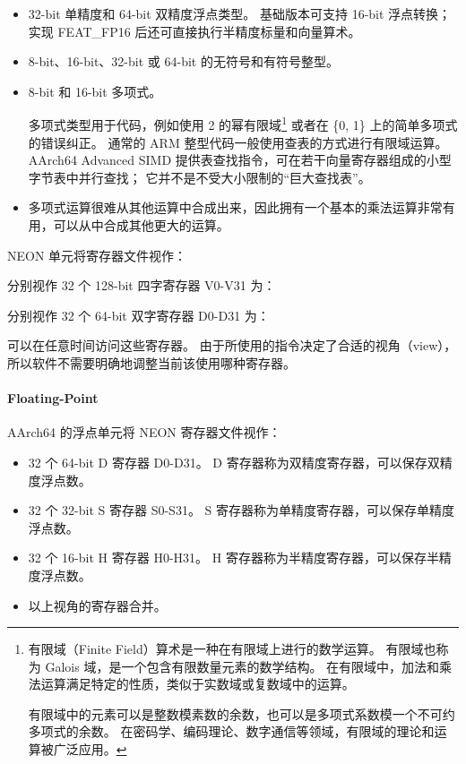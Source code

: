 \begin{itemize}
  \item 32-bit 单精度和 64-bit 双精度浮点类型。
    基础版本可支持 16-bit 浮点转换；实现 FEAT\_FP16 后还可直接执行半精度标量和向量算术。
  \item 8-bit、16-bit、32-bit 或 64-bit 的无符号和有符号整型。
  \item 8-bit 和 16-bit 多项式。

    多项式类型用于代码，例如使用 2 的幂有限域\footnote{
      有限域（Finite Field）算术是一种在有限域上进行的数学运算。
      有限域也称为 Galois 域，是一个包含有限数量元素的数学结构。
      在有限域中，加法和乘法运算满足特定的性质，类似于实数域或复数域中的运算。

      有限域中的元素可以是整数模素数的余数，也可以是多项式系数模一个不可约多项式的余数。
      在密码学、编码理论、数字通信等领域，有限域的理论和运算被广泛应用。
    }
    或者在 \{0, 1\} 上的简单多项式的错误纠正。
    通常的 ARM 整型代码一般使用查表的方式进行有限域运算。
    AArch64 Advanced SIMD 提供表查找指令，可在若干向量寄存器组成的小型字节表中并行查找；
    它并不是不受大小限制的“巨大查找表”。

  \item 多项式运算很难从其他运算中合成出来，因此拥有一个基本的乘法运算非常有用，可以从中合成其他更大的运算。
\end{itemize}

NEON 单元将寄存器文件视作：

分别视作 32 个 128-bit 四字寄存器 V0-V31 为：


分别视作 32 个 64-bit 双字寄存器 D0-D31 为：


可以在任意时间访问这些寄存器。
由于所使用的指令决定了合适的视角（view），所以软件不需要明确地调整当前该使用哪种寄存器。

\paragraph{Floating-Point}

AArch64 的浮点单元将 NEON 寄存器文件视作：

\begin{itemize}
  \item 32 个 64-bit D 寄存器 D0-D31。
    D 寄存器称为双精度寄存器，可以保存双精度浮点数。
  \item 32 个 32-bit S 寄存器 S0-S31。
    S 寄存器称为单精度寄存器，可以保存单精度浮点数。
  \item 32 个 16-bit H 寄存器 H0-H31。
    H 寄存器称为半精度寄存器，可以保存半精度浮点数。
  \item 以上视角的寄存器合并。
\end{itemize}


